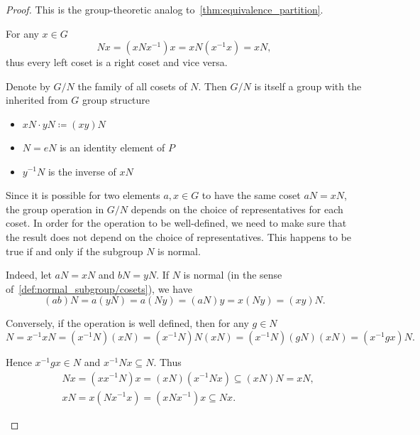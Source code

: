 \begin{proof}
  This is the group-theoretic analog to~\cref{thm:equivalence_partition}.

  \begin{description}
     For any \( x \in G \)
    \begin{equation*}
      Nx = (xNx^{-1})x = xN(x^{-1}x) = xN,
    \end{equation*}
    thus every left coset is a right coset and vice versa.

     Denote by \( G / N \) the family of all cosets of \( N \). Then \( G / N \) is itself a group with the inherited from \( G \) group structure
    \begin{itemize}
      \item \( xN \cdot yN \coloneqq (xy)N \)
      \item \( N = eN \) is an identity element of \( P \)
      \item \( y^{-1} N \) is the inverse of \( xN \)
    \end{itemize}

    Since it is possible for two elements \( a, x \in G \) to have the same coset \( aN = xN \), the group operation in \( G / N \) depends on the choice of representatives for each coset. In order for the operation to be well-defined, we need to make sure that the result does not depend on the choice of representatives. This happens to be true if and only if the subgroup \( N \) is normal.

    Indeed, let \( aN = xN \) and \( bN = yN \). If \( N \) is normal (in the sense of~\ref{def:normal_subgroup/cosets}), we have
    \begin{equation*}
      (ab)N = a(yN) = a(Ny) = (aN)y = x(Ny) = (xy)N.
    \end{equation*}

    Conversely, if the operation is well defined, then for any \( g \in N \)
    \begin{equation*}
      N = x^{-1} x N = (x^{-1} N) (x N) = (x^{-1} N) N (x N) = (x^{-1} N) (g N) (x N) = (x^{-1} g x) N.
    \end{equation*}

    Hence \( x^{-1} g x \in N \) and \( x^{-1} N x \subseteq N \). Thus
    \begin{align*}
      &Nx = (x x^{-1} N)x = (xN) (x^{-1} N x) \subseteq (xN) N = xN,
      \\
      &xN = x(N x^{-1} x) = (x N x^{-1}) x \subseteq Nx.
    \end{align*}


\end{description}
\end{proof}
